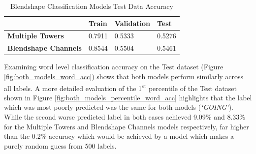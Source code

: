 \begin{table}[h!]
\centering
    \begin{tabular}{l | l | l | l }
    & \textbf{Train} & \textbf{Validation} & \textbf{Test} \\ \hline
    \textbf{Multiple Towers} & 0.7911 & 0.5333 & 0.5276 \\
    \textbf{Blendshape Channels} & 0.8544 & 0.5504 & 0.5461 \\
    \end{tabular} 
    \caption{Blendshape Classification Models Test Data Accuracy}
\end{table}\label{table:classification_test_accuracy}

Examining word level classification accuracy on the Test dataset (Figure \ref{fig:both_models_word_acc}) shows that both models perform similarly across all labels.
A more detailed evaluation of the 1\textsuperscript{st} percentile of the Test dataset shown in Figure \ref{fig:both_models_percentile_word_acc} highlights that the label which was most poorly predicted was the same for both models (\textit{`GOING'}).
While the second worse predicted label in both cases achieved 9.09\% and 8.33\% for the Multiple Towers and Blendshape Channels models respectively, far higher than the 0.2\% accuracy which would be achieved by a model which makes a purely random guess from 500 labels.

